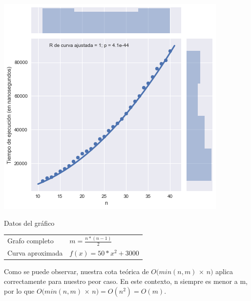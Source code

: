 \noindent
\begin{minipage}{0.55\textwidth}
    \hfill
    \includegraphics[scale=0.6]{img/greedy-complete.png}
\end{minipage}
\hfill
\begin{minipage}{0.44\textwidth}
    \begin{center}
        Datos del gráfico

        \begin{tabular}{ | l l |}
            \hline
            Grafo completo & $m = \frac{n * (n-1)}{2}$\\ 
            Curva aproximada & $f(x) = 50 * x^2 + 3000$ \\
            \hline
        \end{tabular}
    \end{center}
\end{minipage}

Como se puede observar, nuestra cota teórica de $O(min(n,m)$ $\times$ $n)$ aplica correctamente para nuestro peor caso. En este contexto, n siempre es menor a m, por lo que $O(min(n,m)$ $\times$ $n) = O(n^2) = O(m)$.



